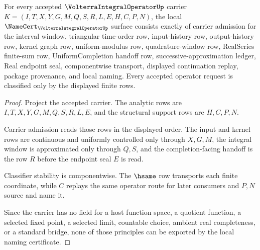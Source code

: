 \begin{theorem}
\label{thm:volterra-integral-operator-namecert-obligations}
For every accepted $\VolterraIntegralOperatorUp$ carrier $K=(I,T,X,Y,G,M,Q,S,R,L,E,H,C,P,N)$, the local $\NameCert_{\VolterraIntegralOperatorUp}$ surface consists exactly of carrier admission for the interval window, triangular time-order row, input-history row, output-history row, kernel graph row, uniform-modulus row, quadrature-window row, RealSeries finite-sum row, UniformCompletion handoff row, successive-approximation ledger, Real endpoint seal, componentwise transport, displayed continuation replay, package provenance, and local naming. Every accepted operator request is classified only by the displayed finite rows.
\end{theorem}
\begin{proof}
Project the accepted carrier. The analytic rows are $I,T,X,Y,G,M,Q,S,R,L,E$, and the structural support rows are $H,C,P,N$.

Carrier admission reads those rows in the displayed order. The input and kernel rows are continuous and uniformly controlled only through $X,G,M$, the integral window is approximated only through $Q,S$, and the completion-facing handoff is the row $R$ before the endpoint seal $E$ is read.

Classifier stability is componentwise. The $\hsame$ row transports each finite coordinate, while $C$ replays the same operator route for later consumers and $P,N$ source and name it.

Since the carrier has no field for a host function space, a quotient function, a selected fixed point, a selected limit, countable choice, ambient real completeness, or a standard bridge, none of those principles can be exported by the local naming certificate.
\end{proof}

